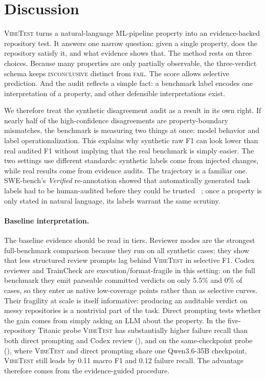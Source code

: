 \documentclass[11pt]{article}
\newcommand{\fail}{\textsc{fail}}
\newcommand{\inconclusive}{\textsc{inconclusive}}
\newcommand{\vibetest}{\textsc{VibeTest}}
\begin{document}
\section{Discussion}
\label{sec:discussion}

\vibetest{} turns a natural-language ML-pipeline property into an
evidence-backed repository test.
It answers one narrow question: given a single property, does the repository
satisfy it, and what evidence shows that.
The method rests on three choices.
Because many properties are only partially observable, the three-verdict schema
keeps \inconclusive{} distinct from \fail{}.
The score allows selective prediction.
And the audit reflects a simple fact: a benchmark label encodes one
interpretation of a property, and other defensible interpretations exist.

We therefore treat the synthetic disagreement audit as a result in its own
right.
If nearly half of the high-confidence disagreements are property-boundary
mismatches, the benchmark is measuring two things at once: model behavior and
label operationalization.
This explains why synthetic raw F1 can look lower than real audited F1 without
implying that the real benchmark is simply easier.
The two settings use different standards: synthetic labels come from injected
changes, while real results come from evidence audits.
The trajectory is a familiar one.
SWE-bench's \emph{Verified} re-annotation showed that automatically generated
task labels had to be human-audited before they could be trusted
~\citep{swebench-verified}; once a property is only stated in natural language,
its labels warrant the same scrutiny.

\paragraph{Baseline interpretation.}
The baseline evidence should be read in tiers.
Reviewer modes are the strongest full-benchmark comparison because they run on
all synthetic cases; they show that less structured review prompts lag behind
\vibetest{} in selective F1.
Codex reviewer and TrainCheck are execution/format-fragile in this setting: on
the full benchmark they emit parseable committed verdicts on only 5.5\% and 0\%
of cases, so they enter  as native low-coverage points rather
than as selective curves.
Their fragility at scale is itself informative: producing an auditable verdict
on messy repositories is a nontrivial part of the task.
Direct prompting tests whether the gain comes from simply asking an LLM about
the property.
In the five-repository Titanic probe \vibetest{} has substantially higher
failure recall than both direct prompting and Codex review (),
and on the same-checkpoint probe (), where \vibetest{} and
direct prompting share one Qwen3.6-35B checkpoint, \vibetest{} still leads by
0.11 macro F1 and 0.12 failure recall.
The advantage therefore comes from the evidence-guided procedure.
\end{document}
